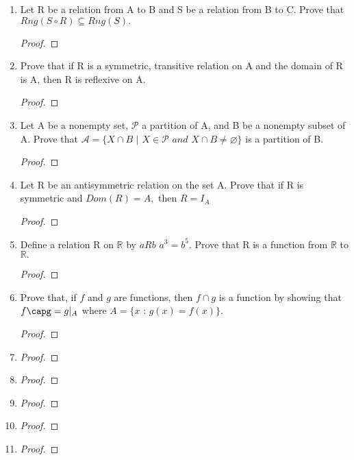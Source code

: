 \documentclass[11pt]{article}
\begin{document}
\begin{enumerate}
    \item Let R be a relation from A to B and S be a relation from B to C. \newline
    Prove that $Rng(S\circ R) \subseteq Rng(S).$
        \begin{proof}
        \end{proof}
        
    \item Prove that if R is a symmetric, transitive relation on A and the domain of R is A, then R is reflexive on A. 
        \begin{proof}
        \end{proof}
        
    \item Let A be a nonempty set, $\mathscr{P}$ a partition of A, and B be a nonempty subset of A. \newline Prove that $\mathscr{A}=\{X \cap B$ $|$ $X \in \mathscr{P}$ $and$ $X \cap B \neq \varnothing \}$ is a partition of B.
        \begin{proof}
        \end{proof}
        
    \item Let R be an antisymmetric relation on the set A. \newnline Prove that if R is symmetric and $Dom(R) = A,$ then $R=I_A$
        \begin{proof}
        \end{proof}
        
    \item Define a relation R on $\mathbb{R}$ by $aRb$ \iff $a^3=b^5$. Prove that R is a function from $\mathbb{R}$ to $\mathbb{R}.$
        \begin{proof}
        \end{proof}
        
    \item Prove that, if $f$ and $g$ are functions, then $f \cap g$ is a function by showing that $f\capg = g|_{A}$ where \newline $A = \{x$ : $g(x) = f(x) \}.$
        \begin{proof}
        \end{proof}
        
    \item
        \begin{proof}
        \end{proof}
        
    \item
        \begin{proof}
        \end{proof}
        
    \item
        \begin{proof}
        \end{proof}
        
    \item
        \begin{proof}
        \end{proof}
        
    \item
        \begin{proof}
        \end{proof}
    
\end{enumerate}
\end{document}
